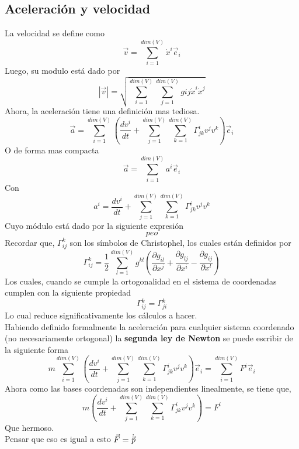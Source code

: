 \documentclass[../main.tex]{subfiles}
\begin{document}
\subsection{Aceleración y velocidad}
La velocidad se define como
\begin{equation}
    \vec{v}=\sum_{i=1}^{dim(V)}\dot{x}^i\vec{e}_i
\end{equation}
Luego, su modulo está dado por
\begin{equation}
    |\vec{v}|=\sqrt{ \sum_{i=1}^{dim({V})}\sum_{j=1}^{dim({V})} g{ij}\dot{x}^i \dot{x}^j  }
\end{equation}
Ahora, la aceleración tiene una definición mas tediosa.
\begin{equation}
    \vec{a}=\sum_{i=1}^{dim(V)} \left( \frac{dv^i}{dt} + \sum_{j=1}^{dim({V})}\sum_{k=1}^{dim({V})} \Gamma_{jk}^i v^j v^k \right) \vec{e}_i
\end{equation}
O de forma mas compacta
\begin{equation}
    \vec{a}=\sum_{i=1}^{dim(V)}a^i \vec{e}_i
\end{equation}
Con
\begin{equation}
    a^i=\frac{dv^i}{dt} +\sum_{j=1}^{dim({V})}\sum_{k=1}^{dim({V})} \Gamma_{jk}^i v^j v^k 
\end{equation}
Cuyo módulo está dado por la siguiente expresión
\begin{equation}
    peo
\end{equation}
Recordar que, $\Gamma_{ij}^k$ son los símbolos de Christophel, los cuales están definidos por
\begin{equation}
    \Gamma_{ij}^k=\frac{1}{2}\sum_{l=1}^{dim(V)}g^{kl}\left( \frac{\partial g_{il}}{\partial x^j}+\frac{\partial g_{lj}}{\partial x^i}- \frac{\partial g_{ij}}{\partial x^l} \right) 
\end{equation}
Los cuales, cuando se cumple la ortogonalidad en el sistema de coordenadas cumplen con la siguiente propiedad
\begin{equation}
    \Gamma_{ij}^k=\Gamma_{ji}^k
\end{equation}
Lo cual reduce significativamente los cálculos a hacer.\\
Habiendo definido formalmente la aceleración para cualquier sistema coordenado (no necesariamente ortogonal)  la \textbf{segunda ley de Newton} se puede escribir de la siguiente forma
\begin{equation}
    m\sum_{i=1}^{dim(V)} \left( \frac{dv^i}{dt} + \sum_{j=1}^{dim({V})}\sum_{k=1}^{dim({V})} \Gamma_{jk}^i v^j v^k \right) \vec{e}_i=\sum_{i=1}^{dim(V)}F^i\vec{e}_i
\end{equation}
Ahora como las bases coordenadas son independientes linealmente, se tiene que,
\begin{equation}
    m \left( \frac{dv^i}{dt} + \sum_{j=1}^{dim({V})}\sum_{k=1}^{dim({V})} \Gamma_{jk}^i v^j v^k \right)=F^i
\end{equation}
Que hermoso. \\
Pensar que eso es igual a esto $\vec{F}=\dot{\vec{\emph{p}}}$
 
\end{document}
